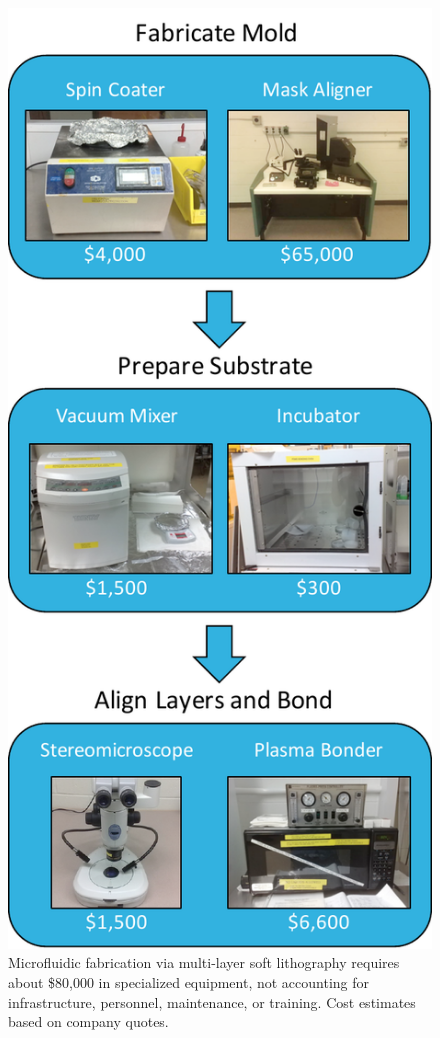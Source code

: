 \begin{figure}[h]
  \begin{minipage}[t]{0.75\linewidth}\centering
    \includegraphics[width=14cm]{equipSoftLith.pdf}
    \medskip
  \end{minipage}\hfill
  \caption[Specialized equipment required to performform soft lithography]{Microfluidic fabrication via multi-layer soft lithography requires about \$80,000 in specialized equipment, not accounting for infrastructure, personnel, maintenance, or training. Cost estimates based on company quotes.}
    \label{fig:equipSoftLith}
\end{figure}


